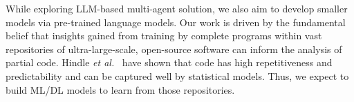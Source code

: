 
  

While exploring LLM-based multi-agent solution, we also aim to develop
smaller models via pre-trained language models. Our work is driven by
the fundamental belief that insights gained from training by complete
programs within vast repositories of ultra-large-scale, open-source
software can inform the analysis of partial code. Hindle {\em et
  al.}~\cite{naturalness-icse12} have shown that code has high
repetitiveness and predictability and can be captured well by
statistical models. Thus, we expect to build ML/DL models to learn
from those repositories.



